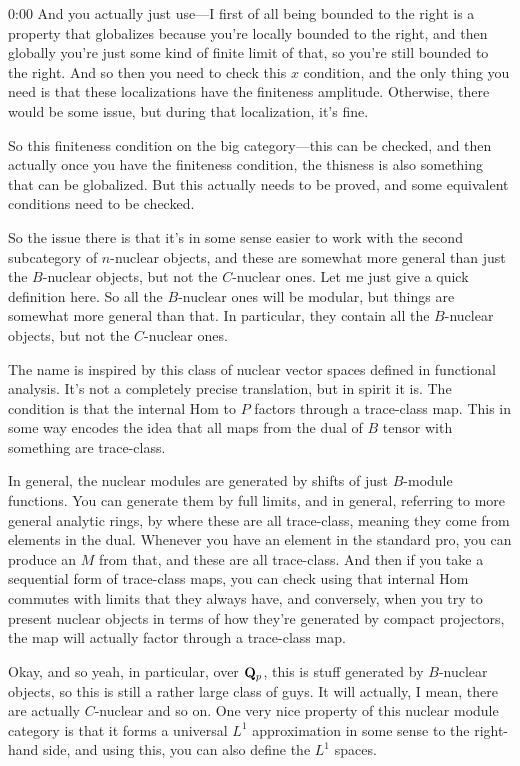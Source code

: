\begin{unfinished}{0:00}
And you actually just use---I first of all being bounded to the right is a property that globalizes because you're locally bounded to the right, and then globally you're just some kind of finite limit of that, so you're still bounded to the right. And so then you need to check this $x$ condition, and the only thing you need is that these localizations have the finiteness amplitude. Otherwise, there would be some issue, but during that localization, it's fine.

So this finiteness condition on the big category---this can be checked, and then actually once you have the finiteness condition, the thisness is also something that can be globalized. But this actually needs to be proved, and some equivalent conditions need to be checked.

So the issue there is that it's in some sense easier to work with the second subcategory of $n$-nuclear objects, and these are somewhat more general than just the $B$-nuclear objects, but not the $C$-nuclear ones. Let me just give a quick definition here. So all the $B$-nuclear ones will be modular, but things are somewhat more general than that. In particular, they contain all the $B$-nuclear objects, but not the $C$-nuclear ones.

The name is inspired by this class of nuclear vector spaces defined in functional analysis. It's not a completely precise translation, but in spirit it is. The condition is that the internal Hom to $P$ factors through a trace-class map. This in some way encodes the idea that all maps from the dual of $B$ tensor with something are trace-class.

In general, the nuclear modules are generated by shifts of just $B$-module functions. You can generate them by full limits, and in general, referring to more general analytic rings, by where these are all trace-class, meaning they come from elements in the dual. Whenever you have an element in the standard pro, you can produce an $M$ from that, and these are all trace-class. And then if you take a sequential form of trace-class maps, you can check using that internal Hom commutes with limits that they always have, and conversely, when you try to present nuclear objects in terms of how they're generated by compact projectors, the map will actually factor through a trace-class map.

Okay, and so yeah, in particular, over $\mathbf Q_p$, this is stuff generated by $B$-nuclear objects, so this is still a rather large class of guys. It will actually, I mean, there are actually $C$-nuclear and so on. One very nice property of this nuclear module category is that it forms a universal $L^1$ approximation in some sense to the right-hand side, and using this, you can also define the $L^1$ spaces.


\end{unfinished}
